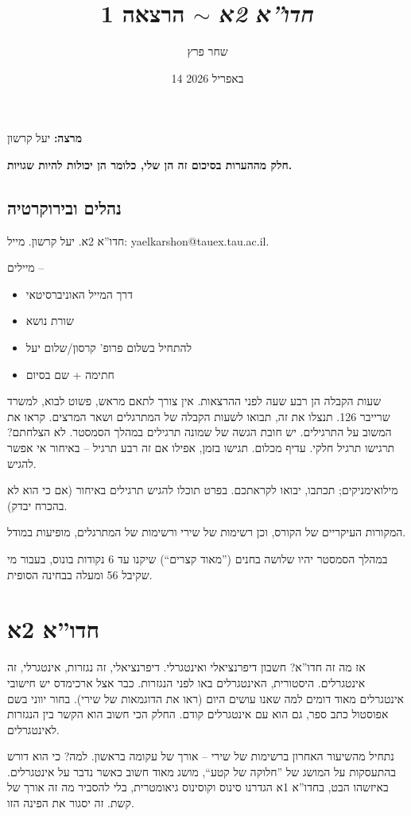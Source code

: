 \documentclass[]{../../../../tex/classes/styledArticle}
\author{שחר פרץ}
\title{\textit{חדו''א 2א $\sim$} הרצאה 1}
\date{14 באפריל 2026}
\begin{document}
	\maketitle
	
	\textbf{מרצה: }יעל קרשון
	
	\textbf{חלק מההערות בסיכום זה הן שלי, כלומר הן יכולות להיות שגויות. }
	
	\subsection{נהלים ובירוקרטיה}
	
	חדו''א 2א. יעל קרשון. מייל: yaelkarshon@tauex.tau.ac.il. 
	
	מיילים – 
	\begin{itemize}
		\item דרך המייל האוניברסיטאי
		\item שורת נושא
		\item להתחיל בשלום פרופ' קרסון/שלום יעל
		\item חתימה + שם בסיום
	\end{itemize}
	שעות הקבלה הן רבע שעה לפני ההרצאות. אין צורך לתאם מראש, פשוט לבוא, למשרד שרייבר 126. תנצלו את זה, תבואו לשעות הקבלה של המתרגלים ושאר המרצים. קראו את המשוב על התרגילים. יש חובת הגשה של שמונה תרגילים במהלך הסמסטר. לא הצלחתם? תרגישו תרגיל חלקי. עדיף מכלום. תגישו בזמן, אפילו אם זה רבע תרגיל – באיחור אי אפשר להגיש. 
	
	מילואימניקים; תכתבו, יבואו לקראתכם. בפרט תוכלו להגיש תרגילים באיחור (אם כי הוא לא בהכרח יבדק). 
	
	המקורות העיקריים של הקורס, וכן רשימות של שירי ורשימות של המתרגלים, מופיעות במודל. 
	
	במהלך הסמסטר יהיו שלושה בחנים (''מאוד קצרים``) שיקנו עד 6 נקודות בונוס, בעבור מי שקיבל 56 ומעלה בבחינה הסופית. 
	
	\section{חדו''א 2א}
	אז מה זה חדו''א? חשבון דיפרנציאלי ואינטגרלי. דיפרנציאלי, זה נגזרות, אינטגרלי, זה אינטגרלים. היסטורית, האינטגרלים באו לפני הנגזרות. כבר אצל ארכימדס יש חישובי אינטגרלים מאוד דומים למה שאנו עושים היום (ראו את הדוגמאות של שירי). בחור יווני בשם אפוסטול כתב ספר, גם הוא עם אינטגרלים קודם. החלק הכי חשוב הוא הקשר בין הנגזרות לאינטגרלים. 
	
	נתחיל מהשיעור האחרון ברשימות של שירי – אורך של עקומה בראשון. למה? כי הוא דורש בהתעסקות על המושג של ''חלוקה של קטע``, מושג מאוד חשוב כאשר נדבר על אינטגרלים. באיזשהו הבט, בחדו''א 1א הגדרנו סינוס וקוסינוס גיאומטרית, בלי להסביר מה זה אורך של קשת. זה יסגור את הפינה הזו. 
	
\end{document}
